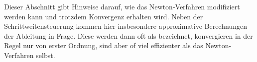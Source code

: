 \begin{remark}
  Dieser Abschnitt gibt Hinweise darauf, wie das Newton-Verfahren
  modifiziert werden kann und trotzdem Konvergenz erhalten wird. Neben
  der Schrittweitensteuerung kommen hier insbesondere approximative
  Berechnungen der Ableitung in Frage. Diese werden dann oft als
   bezeichnet, konvergieren in der
  Regel nur von erster Ordnung, sind aber of viel effizienter als das
  Newton-Verfahren selbst.
\end{remark}

